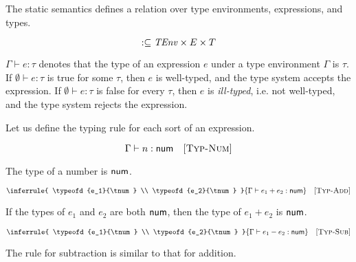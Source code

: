 The static semantics defines a relation over type environments, expressions, and types.

\[:\subseteq\mbox{\emph{TEnv}}\times E\times T\]

$\Gamma\vdash e:\tau$ denotes that the type of an expression $e$ under a type
environment $\Gamma$ is $\tau$. If $\emptyset\vdash e:\tau$ is true for some $\tau$,
then $e$ is well-typed, and the type system accepts the expression. If
$\emptyset\vdash e:\tau$ is false for every $\tau$, then $e$ is
\textit{ill-typed}, i.e. not well-typed, and
the type system rejects the expression.

Let us define the typing rule for each sort of an expression.


\vspace{-1em}

\[
  \Gamma\vdash n:\textsf{num}
  \quad\textsc{[Typ-Num]}
\]

The type of a number is $\textsf{num}$.


\vspace{-1em}

\[
  \inferrule
  { \typeofd{e_1}{\tnum} \\ \typeofd{e_2}{\tnum} }
  { \typeofd{e_1+e_2}{\tnum} }
  \quad\textsc{[Typ-Add]}
\]

If the types of $e_1$ and $e_2$ are both $\textsf{num}$, then the type of
$e_1+e_2$ is $\textsf{num}$.


\vspace{-1em}

\[
  \inferrule
  { \typeofd{e_1}{\tnum} \\ \typeofd{e_2}{\tnum} }
  { \typeofd{e_1-e_2}{\tnum} }
  \quad\textsc{[Typ-Sub]}
\]

The rule for subtraction is similar to that for addition.


\vspace{-1em}


